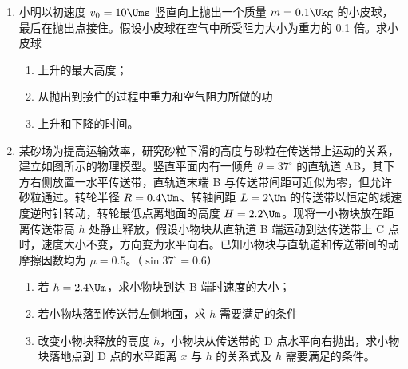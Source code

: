 \documentclass[\gkver]{gaokaozhenti}
\begin{document}
\begin{enumerate}
\item
小明以初速度 $v_{0}=10\Ums$ 竖直向上抛出一个质量 $m=0.1\Ukg$ 的小皮球，最后在抛出点接住。假设小皮球在空气中所受阻力大小为重力的 0.1 倍。求小皮球
\begin{enumerate}
	\item
	上升的最大高度；
	\item
	从抛出到接住的过程中重力和空气阻力所做的功
	\item
	上升和下降的时间。
\end{enumerate}

\item
某砂场为提高运输效率，研究砂粒下滑的高度与砂粒在传送带上运动的关系，建立如图所示的物理模型。竖直平面内有一倾角 $\theta=37^\circ$ 的直轨道 AB，其下方右侧放置一水平传送带，直轨道末端 B 与传送带间距可近似为零，但允许砂粒通过。转轮半径 $R=0.4\Um$、转轴间距 $L=2\Um$ 的传送带以恒定的线速度逆时针转动，转轮最低点离地面的高度 $H=2.2\Um$。现将一小物块放在距离传送带高 $h$ 处静止释放，假设小物块从直轨道 B 端运动到达传送带上 C 点时，速度大小不变，方向变为水平向右。已知小物块与直轨道和传送带间的动摩擦因数均为 $\mu=0.5$。（$\sin37^\circ = 0.6$）
\begin{enumerate}
	\item
	若 $h=2.4\Um$，求小物块到达 B 端时速度的大小；
	\item
	若小物块落到传送带左侧地面，求 $h$ 需要满足的条件
	\item
	改变小物块释放的高度 $h$，小物块从传送带的 D 点水平向右抛出，求小物块落地点到 D 点的水平距离 $x$ 与 $h$ 的关系式及 $h$ 需要满足的条件。
\end{enumerate}
\jdanswer{
\begin{enumerate}
	\item
	$4\Ums$


\end{enumerate}}
\end{enumerate}
\end{document}
